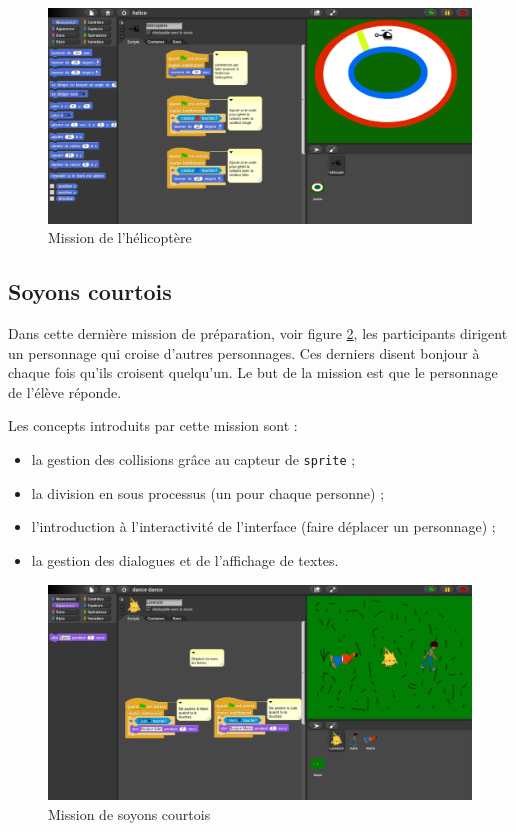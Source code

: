\begin{figure}
  \begin{center}
    \includegraphics[width=\textwidth]{content/7-solution/1-missions/images/helicoptere}
    \caption{Mission de l'hélicoptère}
    \label{fig:mission-hélicoptère}
  \end{center}
\end{figure}

\subsection{Soyons courtois}
\label{mission-courtois}
Dans cette dernière mission de préparation, voir figure \ref{fig:courtois}, les participants dirigent un personnage qui croise d'autres personnages. Ces derniers disent bonjour à chaque fois qu'ils croisent quelqu'un. Le but de la mission est que le personnage de l'élève réponde.

Les concepts introduits par cette mission sont :
\begin{itemize}
\item la gestion des collisions grâce au capteur de \texttt{sprite} ;
\item la division en sous processus (un pour chaque personne) ;
\item l'introduction à l'interactivité de l'interface (faire déplacer un personnage) ;
\item la gestion des dialogues et de l'affichage de textes.
\end{itemize}

\begin{figure}
  \begin{center}
    \includegraphics[width=\textwidth]{content/7-solution/1-missions/images/courtois}
    \caption{Mission de soyons courtois}
    \label{fig:courtois}
  \end{center}
\end{figure}

